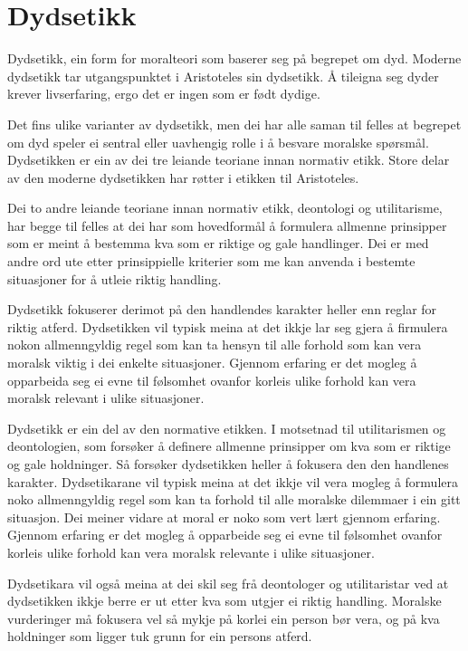 \documentclass[a4paper]{IEEEtran}
\begin{document}
\section{Dydsetikk}
\label{dydsetikk}\bigskip

Dydsetikk, ein form for moralteori som baserer seg på begrepet om dyd. Moderne dydsetikk tar utgangspunktet i Aristoteles sin dydsetikk. Å tileigna seg dyder krever livserfaring, ergo det er ingen som er født dydige.\bigskip

Det fins ulike varianter av dydsetikk, men dei har alle saman til felles at begrepet om dyd speler ei sentral eller uavhengig rolle i å besvare moralske spørsmål. Dydsetikken er ein av dei tre leiande teoriane innan normativ etikk. Store delar av den moderne dydsetikken har røtter i etikken til Aristoteles.\bigskip

Dei to andre leiande teoriane innan normativ etikk, deontologi og utilitarisme, har begge til felles at dei har som hovedformål å formulera allmenne prinsipper som er meint å bestemma kva som er riktige og gale handlinger. Dei er med andre ord ute etter prinsippielle kriterier som me kan anvenda i bestemte situasjoner for å utleie riktig handling.\bigskip

Dydsetikk fokuserer derimot på den handlendes karakter heller enn reglar for riktig atferd. Dydsetikken vil typisk meina at det ikkje lar seg gjera å firmulera nokon allmenngyldig regel som kan ta hensyn til alle forhold som kan vera moralsk viktig i dei enkelte situasjoner. Gjennom erfaring er det mogleg å opparbeida seg ei evne til følsomhet ovanfor korleis ulike forhold kan vera moralsk relevant i ulike situasjoner.\bigskip

Dydsetikk er ein del av den normative etikken. I motsetnad til utilitarismen og deontologien, som forsøker å definere allmenne prinsipper om kva som er riktige og gale holdninger. Så forsøker dydsetikken heller å fokusera den den handlenes karakter. Dydsetikarane vil typisk meina at det ikkje vil vera mogleg å formulera noko allmenngyldig regel som kan ta forhold til alle moralske dilemmaer i ein gitt situasjon. Dei meiner vidare at moral er noko som vert lært gjennom erfaring. Gjennom erfaring er det mogleg å opparbeide seg ei evne til følsomhet ovanfor korleis ulike forhold kan vera moralsk relevante i ulike situasjoner. 

Dydsetikara vil også meina at dei skil seg frå deontologer og utilitaristar ved at dydsetikken ikkje berre er ut etter kva som utgjer ei riktig handling. Moralske vurderinger må fokusera vel så mykje på korlei ein person bør vera, og på kva holdninger som ligger tuk grunn for ein persons atferd. \bigskip
\end{document}
